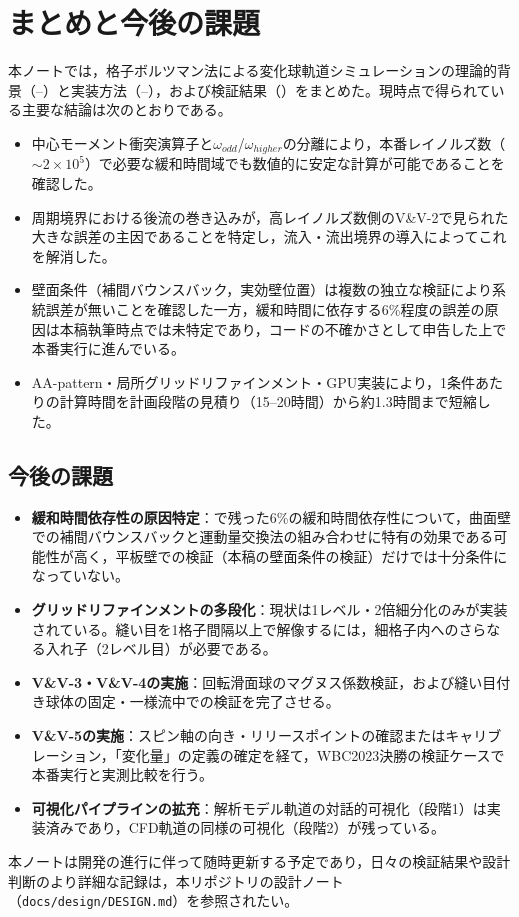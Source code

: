 \section{まとめと今後の課題}

本ノートでは，格子ボルツマン法による変化球軌道シミュレーションの理論的背景（--）と実装方法（--），および検証結果（）をまとめた。現時点で得られている主要な結論は次のとおりである。

\begin{itemize}
	\item 中心モーメント衝突演算子と\(\omega_{odd}\)/\(\omega_{higher}\)の分離により，本番レイノルズ数（\(\sim2\times10^5\)）で必要な緩和時間域でも数値的に安定な計算が可能であることを確認した。
	\item 周期境界における後流の巻き込みが，高レイノルズ数側のV\&V-2で見られた大きな誤差の主因であることを特定し，流入・流出境界の導入によってこれを解消した。
	\item 壁面条件（補間バウンスバック，実効壁位置）は複数の独立な検証により系統誤差が無いことを確認した一方，緩和時間に依存する6\%程度の誤差の原因は本稿執筆時点では未特定であり，コードの不確かさとして申告した上で本番実行に進んでいる。
	\item AA-pattern・局所グリッドリファインメント・GPU実装により，1条件あたりの計算時間を計画段階の見積り（15--20時間）から約1.3時間まで短縮した。
\end{itemize}

\subsection{今後の課題}

\begin{itemize}
	\item \textbf{緩和時間依存性の原因特定}：で残った6\%の緩和時間依存性について，曲面壁での補間バウンスバックと運動量交換法の組み合わせに特有の効果である可能性が高く，平板壁での検証（本稿の壁面条件の検証）だけでは十分条件になっていない。
	\item \textbf{グリッドリファインメントの多段化}：現状は1レベル・2倍細分化のみが実装されている。縫い目を1格子間隔以上で解像するには，細格子内へのさらなる入れ子（2レベル目）が必要である。
	\item \textbf{V\&V-3・V\&V-4の実施}：回転滑面球のマグヌス係数検証，および縫い目付き球体の固定・一様流中での検証を完了させる。
	\item \textbf{V\&V-5の実施}：スピン軸の向き・リリースポイントの確認またはキャリブレーション，「変化量」の定義の確定を経て，WBC2023決勝の検証ケースで本番実行と実測比較を行う。
	\item \textbf{可視化パイプラインの拡充}：解析モデル軌道の対話的可視化（段階1）は実装済みであり，CFD軌道の同様の可視化（段階2）が残っている。
\end{itemize}

本ノートは開発の進行に伴って随時更新する予定であり，日々の検証結果や設計判断のより詳細な記録は，本リポジトリの設計ノート（\texttt{docs/design/DESIGN.md}）を参照されたい。
